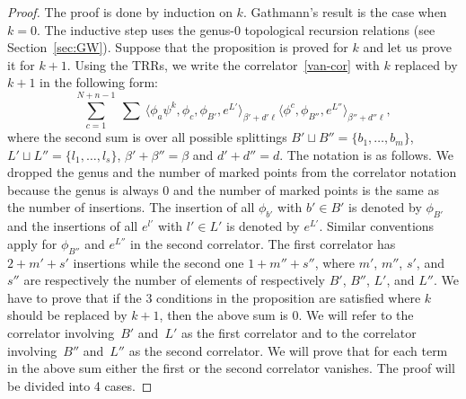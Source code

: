 \documentclass[10pt,a4paper]{article}
\numberwithin{equation}{section}
\begin{document}
\begin{proof}
The proof is done by induction on $k$. Gathmann's result is the case
when $k=0$. The inductive step uses the genus-0 topological recursion
relations (see Section~\ref{sec:GW}). Suppose that the proposition is
proved for $k$ and let us prove it for $k+1$. Using the TRRs, we write
the correlator~\eqref{van-cor} with $k$ replaced by $k+1$ in the
following form:
\[
\sum_{c=1}^{N+n-1}\ \sum\
\big\langle \phi_a\psi^k, \phi_c,\phi_{B'}, e^{L'}\big\rangle_{\beta'+d'\ell}
\big\langle \phi^c, \phi_{B''}, e^{L''}\big\rangle_{\beta''+d''\ell},
\]
where the second sum is over all possible splittings $B'\sqcup B''=\{b_1,\dots,b_m\}$,
$L'\sqcup L''=\{l_1,\dots,l_s\}$, $\beta'+\beta''=\beta$ and $d'+d''=d$. The notation is as
follows. We dropped the genus and the number of marked points from the correlator
notation because the genus is always $0$ and the number of marked
points is the same as the
number of insertions. The insertion of all
$\phi_{b'}$ with $b'\in B'$ is denoted by $\phi_{B'}$ and the
insertions of all $e^{l'}$ with $l'\in L'$ is denoted by
$e^{L'}$. Similar conventions apply for $\phi_{B''}$ and
$e^{L''}$ in the second correlator. The first correlator has $2+m'+s'$ insertions while
the second one $1+m''+s''$, where $m'$, $m''$, $s'$, and $s''$ are
respectively the number of elements
of respectively $B'$, $B''$, $L'$, and $L''$. We have to prove that if
the 3 conditions in the proposition
are satisfied where $k$ should be replaced by $k+1$, then the above
sum is $0$. We will refer to the correlator involving~$B'$ and~$L'$ as
the first correlator and to the correlator involving~$B''$ and~$L''$
as the second correlator. We will prove that for each term in the
above sum either the first or the second correlator vanishes. The
proof will be divided into 4 cases.


\end{proof}
\end{document}
